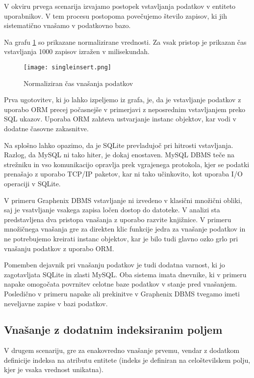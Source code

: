 \documentclass[a4paper,12pt,openright]{book}
\begin{document}
    V okviru prvega scenarija izvajamo postopek vstavljanja podatkov v entiteto uporabnikov. V tem procesu postopoma povečujemo število zapisov, ki jih sistematično vnašamo v podatkovno bazo.

    Na grafu \ref{vnos} so prikazane normalizirane vrednosti. Za vsak pristop je prikazan čas vstavljanja 1000 zapisov izražen v milisekundah.
   
   \begin{figure}[H]
        \centerline{\texttt{[image: singleinsert.png]}}
        \caption{Normaliziran čas vnašanja podatkov}
        \label{vnos}
    \end{figure}

    \noindent
    Prva ugotovitev, ki jo lahko izpeljemo iz grafa, je, da je vstavljanje podatkov z uporabo ORM precej počasnejše v primerjavi z neposrednim vstavljanjem preko SQL ukazov. Uporaba ORM zahteva ustvarjanje instanc objektov, kar vodi v dodatne časovne zakasnitve.

    Na splošno lahko opazimo, da je SQLite prevladujoč pri hitrosti vstavljanja. Razlog, da MySQL ni tako hiter, je dokaj enostaven. MySQL DBMS teče na strežniku in vso komunikacijo opravlja prek vgrajenega protokola, kjer se podatki prenašajo z uporabo TCP/IP paketov, kar ni tako učinkovito, kot uporaba I/O operaciji v SQLite.

    V primeru Graphenix DBMS vstavljanje ni izvedeno v klasični množični obliki, saj je vsatvljanje vsakega zapisa ločen dostop do datoteke. V analizi sta predstavljena dva pristopa vnašanja z uporabo razvite knjižnice. V primeru množičnega vnašanja gre za direkten klic funkcije jedra za vnašanje podatkov in ne potrebujemo kreirati instanc objektov, kar je bilo tudi glavno ozko grlo pri vnašanju podatkov z uporabo ORM.

    Pomemben dejavnik pri vnašanju podatkov je tudi dodatna varnost, ki jo zagotavljata SQLite in zlasti MySQL. Oba sistema imata dnevnike, ki v primeru napake omogočata povrnitev celotne baze podatkov v stanje pred vnašanjem. Posledično v primeru napake ali prekinitve v Graphenix DBMS tvegamo imeti neveljavne zapise v bazi podatkov.

    \subsection{Vnašanje z dodatnim indeksiranim poljem}

    V drugem scenariju, gre za enakovredno vnašanje prvemu, vendar z dodatkom definicije indeksa na atributu entitete (indeks je definiran na celoštevilskem polju, kjer je vsaka vrednost unikatna).
    
\end{document}
